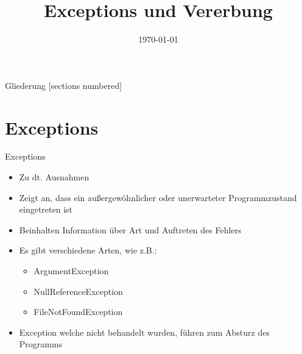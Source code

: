 



\title{Exceptions und Vererbung}
\date{\today}




\maketitle

\begin{frame}{Gliederung}
	[sections numbered]
	\tableofcontents
\end{frame}

\section{Exceptions}
\begin{frame}{Exceptions}
	\begin{itemize}
		\item Zu dt. Ausnahmen
		\item Zeigt an, dass ein außergewöhnlicher oder unerwarteter Programmzustand eingetreten ist
		\item Beinhalten Information über Art und Auftreten des Fehlers
		\item Es gibt verschiedene Arten, wie z.B.:
		\begin{itemize} 
			\item ArgumentException
			\item NullReferenceException	
			\item FileNotFoundException
		\end{itemize}
		\item Exception welche nicht behandelt wurden, führen zum Absturz des Programms
	\end{itemize}
\end{frame}

